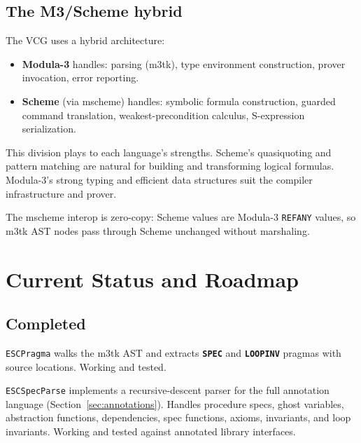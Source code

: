 \documentclass[11pt]{article}
\newcommand{\m}[1]{\texttt{#1}}
\newcommand{\kw}[1]{\texttt{\textbf{#1}}}
\begin{document}
\subsection{The M3/Scheme hybrid}

The VCG uses a hybrid architecture:
\begin{itemize}[nosep]
  \item \textbf{Modula-3} handles: parsing (m3tk), type environment
    construction, prover invocation, error reporting.
  \item \textbf{Scheme} (via mscheme) handles: symbolic formula
    construction, guarded command translation, weakest-precondition
    calculus, S-expression serialization.
\end{itemize}

This division plays to each language's strengths.  Scheme's
quasiquoting and pattern matching are natural for building and
transforming logical formulas.  Modula-3's strong typing and
efficient data structures suit the compiler infrastructure and prover.

The mscheme interop is zero-copy: Scheme values are Modula-3
\m{REFANY} values, so m3tk AST nodes pass through Scheme unchanged
without marshaling.

\section{Current Status and Roadmap}
\label{sec:roadmap}

\subsection{Completed}

\begin{description}[nosep,leftmargin=2em]
  \item[Phase 0: Pragma extraction.]
    \m{ESCPragma} walks the m3tk AST and extracts \kw{SPEC} and
    \kw{LOOPINV} pragmas with source locations.  Working and tested.

  \item[Phase 1: Specification parsing.]
    \m{ESCSpecParse} implements a recursive-descent parser for the
    full annotation language (Section~\ref{sec:annotations}).
    Handles procedure specs, ghost variables, abstraction functions,
    dependencies, spec functions, axioms, invariants, and loop
    invariants.  Working and tested against annotated library
    interfaces.
\end{description}
\end{document}
